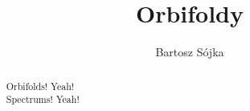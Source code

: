 \documentclass[a4paper, 12pt, twosided]{report}
\title{Orbifoldy}
\author{Bartosz Sójka}
\begin{document}

\tableofcontents
\begin{abstract}
\begin{center}
Orbifolds! Yeah! \\
Spectrums! Yeah! 
\end{center}

\end{abstract}







%

\end{document}
